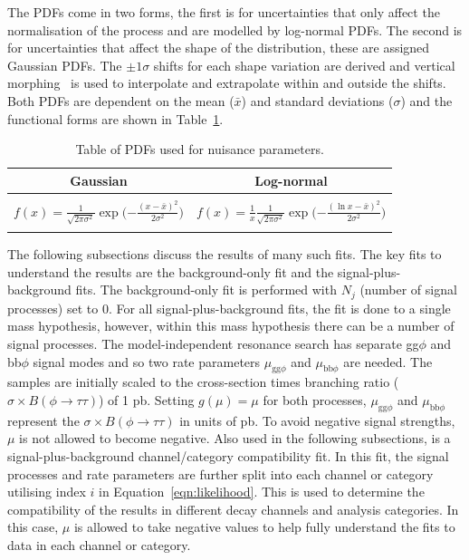 The \ac{PDF}s come in two forms, the first is for uncertainties that only affect the normalisation of the process and are modelled by log-normal \ac{PDF}s. 
The second is for uncertainties that affect the shape of the distribution, these are assigned Gaussian \ac{PDF}s.
The $\pm1\sigma$ shifts for each shape variation are derived and vertical morphing~\cite{Conway:2011in} is used to interpolate and extrapolate within and outside the shifts.
Both \ac{PDF}s are dependent on the mean ($\bar{x}$) and standard deviations ($\sigma$) and the functional forms are shown in Table~\ref{tab:pdfs}. \\

\begin{table}[t]
    \centering
    \begin{tabular}{|c|c|}
         \hline
         Gaussian & Log-normal  \\
         \hline
         \hline
          & \\
         $f(x) = \frac{1}{\sqrt{2\pi\sigma^{2}}} \exp\Big({-\frac{(x - \bar{x})^2}{2\sigma^2}}\Big)$ & $f(x) = \frac{1}{x} \frac{1}{\sqrt{2\pi\sigma^{2}}} \exp\Big({-\frac{(\ln x - \bar{x})^2}{2\sigma^2}}\Big)$ \\
          & \\
         \hline
    \end{tabular}
    \caption[PDFs used for nuisance parameters.]{Table of PDFs used for nuisance parameters.}
    \label{tab:pdfs}
\end{table}

The following subsections discuss the results of many such fits.
The key fits to understand the results are the background-only fit and the signal-plus-background fits.
The background-only fit is performed with $N_j$ (number of signal processes) set to 0.
For all signal-plus-background fits, the fit is done to a single mass hypothesis, however, within this mass hypothesis there can be a number of signal processes.
The model-independent resonance search has separate gg$\phi$ and bb$\phi$ signal modes and so two rate parameters $\mu_{\text{gg}\phi}$ and $\mu_{\text{bb}\phi}$ are needed.
The samples are initially scaled to the cross-section times branching ratio ($\sigma \times B (\phi\rightarrow\tau\tau)$) of 1 pb.
Setting $g(\mu)=\mu$ for both processes, $\mu_{\text{gg}\phi}$ and $\mu_{\text{bb}\phi}$ represent the $\sigma \times B (\phi\rightarrow\tau\tau)$ in units of pb.
To avoid negative signal strengths, $\mu$ is not allowed to become negative.
Also used in the following subsections, is a signal-plus-background channel/category compatibility fit.
In this fit, the signal processes and rate parameters are further split into each channel or category utilising index $i$ in Equation~\ref{eqn:likelihood}.
This is used to determine the compatibility of the results in different decay channels and analysis categories.
In this case, $\mu$ is allowed to take negative values to help fully understand the fits to data in each channel or category. \\


